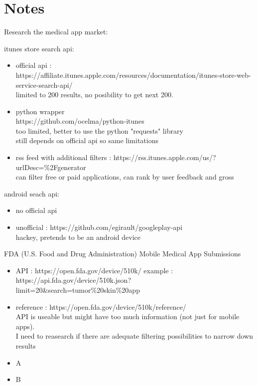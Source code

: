 \section{Notes}

Research the medical app market:

\noindent
itunes store search api:

\begin{itemize}
\item official api :
\\ https://affiliate.itunes.apple.com/resources/documentation/itunes-store-web-service-search-api/
\\ limited to 200 results, no posibility to get next 200.
\item python wrapper
\\ https://github.com/ocelma/python-itunes
\\ too limited, better to use the python "requests" library
\\ still depends on official api so same limitations
\item rss feed with additional filters : https://rss.itunes.apple.com/us/?urlDesc=\%2Fgenerator
\\ can filter free or paid applications, can rank by user feedback and gross

\end{itemize}

\noindent
android seach api:
\begin{itemize}
\item no official api
\item unofficial : https://github.com/egirault/googleplay-api
\\ hackey, pretends to be an android device
\end{itemize}

\noindent
FDA (U.S. Food and Drug Administration) Mobile Medical App Submissions
\begin{itemize}
\item API : https://open.fda.gov/device/510k/ example : https://api.fda.gov/device/510k.json?limit=20\&search=tumor\%20skin\%20app
\item reference : https://open.fda.gov/device/510k/reference/
\\ API is useable but might have too much information (not just for mobile apps).
\\ I need to reasearch if there are adequate filtering possibilities to narrow down results
\end{itemize}

\noindent
\begin{itemize}
\item A
\item B
\end{itemize}